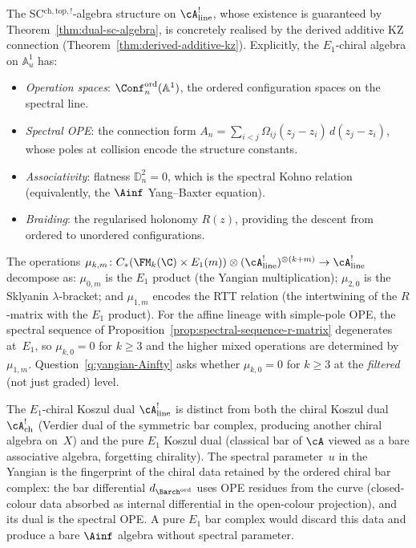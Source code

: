 \begin{remark}%
\label{rem:E1-chiral-from-KZ}%
The SC${}^{\mathrm{ch,top},!}$-algebra structure on
$\cA^!_{\mathrm{line}}$, whose existence is
guaranteed by Theorem~\ref{thm:dual-sc-algebra}, is
concretely realised by the derived additive KZ connection
(Theorem~\ref{thm:derived-additive-kz}). Explicitly, the
$E_1$-chiral algebra on $\mathbb{A}^1_u$ has:
\begin{itemize}[nosep]
\item \emph{Operation spaces}:
 $\Conf_n^{\mathrm{ord}}(\mathbb{A}^1)$, the ordered configuration
 spaces on the spectral line.
\item \emph{Spectral OPE}: the connection form
 $A_n = \sum_{i<j}\Omega_{ij}(z_j{-}z_i)\,d(z_j{-}z_i)$,
 whose poles at collision encode the structure constants.
\item \emph{Associativity}: flatness $\mathbb D_n^2 = 0$,
 which is the spectral Kohno relation (equivalently, the
 $\Ainf$ Yang--Baxter equation).
\item \emph{Braiding}: the regularised holonomy $R(z)$,
 providing the descent from ordered to unordered
 configurations.
\end{itemize}
The operations $\mu_{k,m}\colon
C_*(\FM_k(\C) \times E_1(m))
\otimes (\cA^!_{\mathrm{line}})^{\otimes(k+m)}
\to \cA^!_{\mathrm{line}}$ decompose as:
$\mu_{0,m}$ is the $E_1$ product (the Yangian multiplication);
$\mu_{2,0}$ is the Sklyanin $\lambda$-bracket; and
$\mu_{1,m}$ encodes the RTT relation (the intertwining of
the $R$-matrix with the $E_1$ product). For the affine lineage
with simple-pole OPE, the spectral sequence of
Proposition~\ref{prop:spectral-sequence-r-matrix} degenerates
at~$E_1$, so $\mu_{k,0} = 0$ for $k \ge 3$ and the higher
mixed operations are determined by $\mu_{1,m}$.
Question~\ref{q:yangian-Ainfty} asks whether
$\mu_{k,0} = 0$ for $k \ge 3$ at the \emph{filtered}
(not just graded) level.

The $E_1$-chiral Koszul dual $\cA^!_{\mathrm{line}}$ is
distinct from both the chiral Koszul dual~$\cA^!_{\mathrm{ch}}$
(Verdier dual of the symmetric bar complex, producing another
chiral algebra on~$X$) and the pure $E_1$ Koszul dual
(classical bar of $\cA$ viewed as a bare associative algebra,
forgetting chirality). The spectral parameter~$u$ in the
Yangian is the fingerprint of the chiral data retained by the
ordered chiral bar complex: the bar differential
$d_{{\Barch}^{\mathrm{ord}}}$ uses OPE residues from the curve
(closed-colour data absorbed as internal differential in the
open-colour projection), and its dual is the spectral OPE.
A pure $E_1$ bar complex would discard this data and produce a
bare $\Ainf$ algebra without spectral parameter.
\end{remark}

